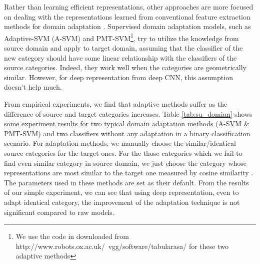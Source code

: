 Rather than learning efficient representations, other approaches are more focused on dealing with the representations learned from conventional feature extraction methods for domain adaptation \cite{yang2007adapting} \cite{aytar2011tabula}. Supervised domain adaptation models, such as Adaptive-SVM (A-SVM) and PMT-SVM\footnote{We use the code in \cite{aytar2011tabula} downloaded from http://www.robots.ox.ac.uk/~vgg/software/tabularasa/ for these two adaptive methods}, try to utilize the knowledge from source domain and apply to target domain, assuming that the classifier of the new category should have some linear relationship with the classifiers of the source categories. Indeed, they work well when the categories are geometrically similar. However, for deep representation from deep CNN, this assumption doesn't help much.

From empirical experiments, we find that adaptive methods suffer as the difference of source and target categories increases. Table \ref{tab:su_domian} shows some experiment results for two typical domain adaptation methods (A-SVM \& PMT-SVM) and two classifiers without any adaptation in a binary classification scenario. For adaptation methods, we manually choose the similar/identical source categories for the target ones. For the those categories which we fail to find even similar category in source domain, we just choose the category whose representations are most similar to the target one measured by cosine similarity \cite{aytar2011tabula}. The parameters used in these methods are set as their default. From the results of our simple experiment, we can see that using deep representation, even to adapt identical category, the improvement of the adaptation technique is not significant compared to raw models.

